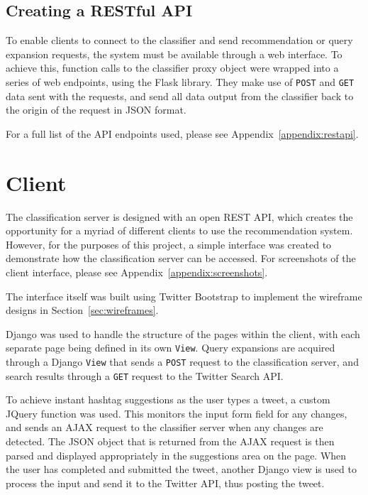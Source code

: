 \documentclass[11pt,a4paper]{report}
\begin{document}
\subsection{Creating a RESTful API}
To enable clients to connect to the classifier and send recommendation or query expansion requests, the system must be available through a web interface. To achieve this, function calls to the classifier proxy object were wrapped into a series of web endpoints, using the Flask library. They make use of \texttt{POST} and \texttt{GET} data sent with the requests, and send all data output from the classifier back to the origin of the request in JSON format.

For a full list of the API endpoints used, please see Appendix~\ref{appendix:restapi}.

\section{Client}
The classification server is designed with an open REST API, which creates the opportunity for a myriad of different clients to use the recommendation system. However, for the purposes of this project, a simple interface was created to demonstrate how the classification server can be accessed. For screenshots of the client interface, please see Appendix~\ref{appendix:screenshots}.

The interface itself was built using Twitter Bootstrap to implement the wireframe designs in Section~\ref{sec:wireframes}.

Django was used to handle the structure of the pages within the client, with each separate page being defined in its own \texttt{View}. Query expansions are acquired through a Django \texttt{View} that sends a \texttt{POST} request to the classification server, and search results through a \texttt{GET} request to the Twitter Search API.

To achieve instant hashtag suggestions as the user types a tweet, a custom JQuery function was used. This monitors the input form field for any changes, and sends an AJAX request to the classifier server when any changes are detected. The JSON object that is returned from the AJAX request is then parsed and displayed appropriately in the suggestions area on the page. When the user has completed and submitted the tweet, another Django view is used to process the input and send it to the Twitter API, thus posting the tweet.

\end{document}

